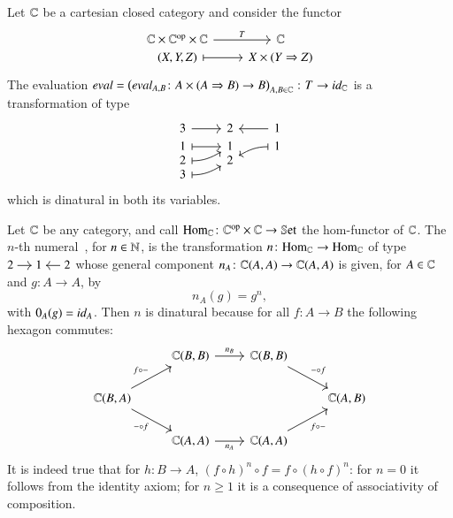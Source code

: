 \begin{example}\label{ex:eval}
	Let $\mathbb C$ be a cartesian closed category and consider the functor
	\[
	\begin{tikzcd}[row sep=0em]
	\C \times \Op\C \times \C  \ar[r,"T"] & \C \\
	(X,Y,Z) \ar[r,|->] & X \times (Y \Rightarrow Z)
	\end{tikzcd}
	\]
	The evaluation 
	$
	\eval{}{} = \left(\eval A B \colon A \times (A \implies B) \to B\right)_{A,B \in \C} \colon T \to \id\C
	$
	is a transformation of type
	\[
	\begin{tikzcd}[row sep=0em]
	3 \ar[r] & 2 & 1 \ar[l] \\
	1 \ar[r,|->] & 1 & 1 \ar[dl,|->,out=180,in=30] \\[-3pt]
	2 \ar[ur,|->,out=0,in=210]& 2 & \\[-3pt]
	3 \ar[ur,|->,out=0,in=210]
	\end{tikzcd}
	\]
	which is dinatural in both its variables.
\end{example}

\begin{example}\label{ex:Church numeral}
	Let $\mathbb C$ be any category, and call $\mathrm{Hom}_{\mathbb C} \colon \mathbb C^{\text{op}} \times \mathbb C \to \mathbb{S}\mathrm{et}$ the hom-functor of $\mathbb C$. The $n$-th numeral~\cite{dubuc_dinatural_1970}, for $n \in \mathbb N$, is the transformation $n \colon \mathrm{Hom}_{\mathbb C} \to \mathrm{Hom}_{\mathbb C}$ of type
	$
	\begin{tikzcd}[cramped,sep=small]
	2 \ar[r] & 1 & \ar[l] 2
	\end{tikzcd}
	$
	whose general component $n_A \colon \mathbb C(A,A) \to \mathbb C(A,A)$ is given, for $A \in \mathbb C$ and $g \colon A \to A$, by
	\[
	n_A (g) = g^n,
	\]
	with $0_A (g) = \mathop{\textit{id}_{A}}$. 	Then $n$ is dinatural because for all $f \colon A \to B$ the following hexagon commutes:
	\[
	\begin{tikzcd}
	& \C(B,B) \ar[r,"n_B"] & \C(B,B) \ar[dr,"-\circ f"] \\
	\C(B,A) \ar[ur,"f\circ -"] \ar[dr,"-\circ f"'] & & & \C(A,B) \\
	& \C(A,A) \ar[r,"n_A"'] & \C(A,A) \ar[ur,"f \circ -"']
	\end{tikzcd}	
	\]
	It is indeed true that for $h \colon B \to A$, $(f \circ h)^n \circ f = f \circ (h \circ f)^n$: for $n=0$ it follows from the identity axiom; for $n \ge 1$ it is a consequence of associativity of composition.
\end{example}

